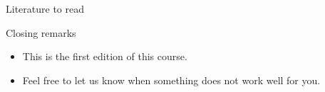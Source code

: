 \begin{frame}{Literature to read}
\nocite{*}
\AtNextBibliography{\footnotesize}
\printbibliography
\end{frame}

\begin{frame}{Closing remarks}
\begin{itemize}
    \item This is the first edition of this course.
    \item Feel free to let us know when something does not work well for you.
\end{itemize}
\end{frame}
